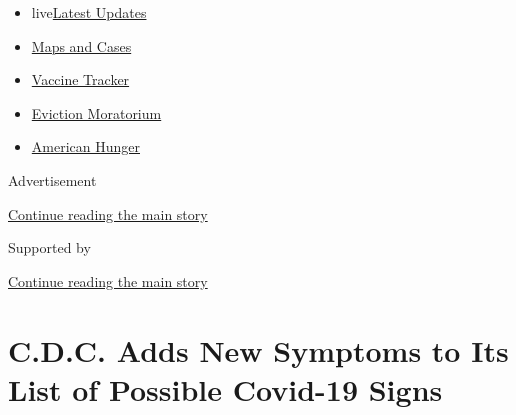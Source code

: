 \begin{itemize}
\tightlist
\item
  live\href{https://www.nytimes3xbfgragh.onion/2020/09/09/world/covid-19-coronavirus.html?name=styln-coronavirus-national\&region=TOP_BANNER\&block=storyline_menu_recirc\&action=click\&pgtype=Article\&impression_id=ca1f3871-f284-11ea-84fb-6965c80d8485\&variant=undefined}{Latest
  Updates}
\item
  \href{https://www.nytimes3xbfgragh.onion/interactive/2020/us/coronavirus-us-cases.html?name=styln-coronavirus-national\&region=TOP_BANNER\&block=storyline_menu_recirc\&action=click\&pgtype=Article\&impression_id=ca1f3872-f284-11ea-84fb-6965c80d8485\&variant=undefined}{Maps
  and Cases}
\item
  \href{https://www.nytimes3xbfgragh.onion/interactive/2020/science/coronavirus-vaccine-tracker.html?name=styln-coronavirus-national\&region=TOP_BANNER\&block=storyline_menu_recirc\&action=click\&pgtype=Article\&impression_id=ca1f5f80-f284-11ea-84fb-6965c80d8485\&variant=undefined}{Vaccine
  Tracker}
\item
  \href{https://www.nytimes3xbfgragh.onion/2020/09/02/your-money/eviction-moratorium-covid.html?name=styln-coronavirus-national\&region=TOP_BANNER\&block=storyline_menu_recirc\&action=click\&pgtype=Article\&impression_id=ca1f5f81-f284-11ea-84fb-6965c80d8485\&variant=undefined}{Eviction
  Moratorium}
\item
  \href{https://www.nytimes3xbfgragh.onion/interactive/2020/09/02/magazine/food-insecurity-hunger-us.html?name=styln-coronavirus-national\&region=TOP_BANNER\&block=storyline_menu_recirc\&action=click\&pgtype=Article\&impression_id=ca1f5f82-f284-11ea-84fb-6965c80d8485\&variant=undefined}{American
  Hunger}
\end{itemize}

Advertisement

\protect\hyperlink{after-top}{Continue reading the main story}

Supported by

\protect\hyperlink{after-sponsor}{Continue reading the main story}

\hypertarget{cdc-adds-new-symptoms-to-its-list-of-possible-covid-19-signs}{%
\section{C.D.C. Adds New Symptoms to Its List of Possible Covid-19
Signs}\label{cdc-adds-new-symptoms-to-its-list-of-possible-covid-19-signs}}

